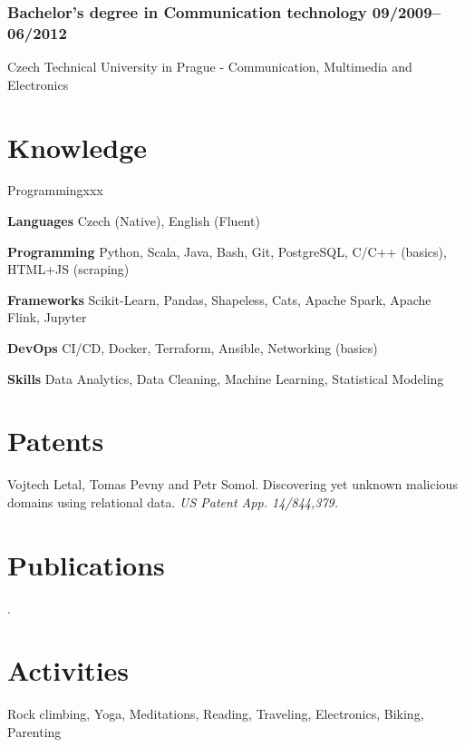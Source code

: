 \documentclass[11pt]{article}
\begin{document}
\subsubsection*{\bf Bachelor’s degree in Communication technology \hfill 09/2009--06/2012}
\vspace{-1.5mm}
Czech Technical University in Prague -
Communication, Multimedia and Electronics

\section*{Knowledge}
\begin{labeling}{Programmingxxx}
	\setlength\itemsep{-0.15em}
    \item [\textbf{Languages}] Czech (Native), English (Fluent)
    \item [\textbf{Programming}] Python, Scala, Java, Bash, Git, PostgreSQL, C/C++ (basics), HTML+JS (scraping)
    \item [\textbf{Frameworks}] Scikit-Learn, Pandas, Shapeless, Cats, Apache Spark, Apache Flink, Jupyter
    \item [\textbf{DevOps}] CI/CD, Docker, Terraform, Ansible, Networking (basics)
    \item [\textbf{Skills}] Data Analytics, Data Cleaning, Machine Learning, Statistical Modeling
    
\end{labeling}

\section*{Patents}
Vojtech Letal, Tomas Pevny and Petr Somol. Discovering yet unknown malicious domains using relational data. {\it US Patent App. 14/844,379.}



\section*{Publications}
.

\section*{Activities}
Rock climbing, Yoga, Meditations, Reading, Traveling, Electronics, Biking, Parenting

\vfill
\end{document}
